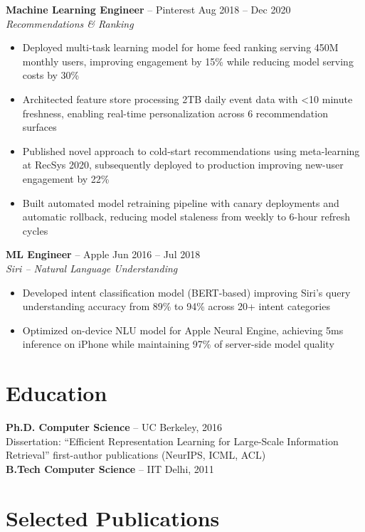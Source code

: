 \documentclass[11pt,letterpaper]{article}
\begin{document}
\textbf{Machine Learning Engineer} -- Pinterest \hfill Aug 2018 -- Dec 2020\\
{\itshape Recommendations \& Ranking}
\begin{itemize}
    \item Deployed multi-task learning model for home feed ranking serving 450M monthly users, improving engagement by 15\% while reducing model serving costs by 30\%
    \item Architected feature store processing 2TB daily event data with <10 minute freshness, enabling real-time personalization across 6 recommendation surfaces
    \item Published novel approach to cold-start recommendations using meta-learning at RecSys 2020, subsequently deployed to production improving new-user engagement by 22\%
    \item Built automated model retraining pipeline with canary deployments and automatic rollback, reducing model staleness from weekly to 6-hour refresh cycles
\end{itemize}

\textbf{ML Engineer} -- Apple \hfill Jun 2016 -- Jul 2018\\
{\itshape Siri -- Natural Language Understanding}
\begin{itemize}
    \item Developed intent classification model (BERT-based) improving Siri's query understanding accuracy from 89\% to 94\% across 20+ intent categories
    \item Optimized on-device NLU model for Apple Neural Engine, achieving 5ms inference on iPhone while maintaining 97\% of server-side model quality
\end{itemize}

\section{Education}

\textbf{Ph.D. Computer Science} -- UC Berkeley, 2016\\
{\small Dissertation: ``Efficient Representation Learning for Large-Scale Information Retrieval''  first-author publications (NeurIPS, ICML, ACL)}\\[3pt]
\textbf{B.Tech Computer Science} -- IIT Delhi, 2011

\section{Selected Publications}
\end{document}
